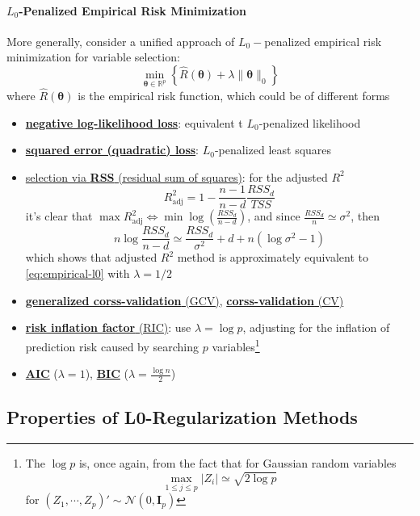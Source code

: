 \documentclass[twoside]{article}
\begin{document}
\paragraph*{$L_0$-Penalized Empirical Risk Minimization} More generally, consider a unified approach of $L_0-$penalized empirical risk minimization for variable selection:
\begin{equation}\label{eq:empirical-l0}
    \min_{\boldsymbol{\theta}\in\mathbb{R}^p}\left\{\hat{R}(\boldsymbol{\theta}) + \lambda\lVert \boldsymbol{\theta} \rVert _0 \right\}
\end{equation}
where $\hat{R}(\boldsymbol{\theta})$ is the empirical risk function, which could be of different forms
\begin{itemize}
    \item \underline{\textbf{negative log-likelihood loss}}: equivalent t $L_0$-penalized likelihood 
    \item \textbf{\underline{squared error (quadratic) loss}}: $L_0$-penalized least squares
    \item \underline{selection via \textbf{RSS} (residual sum of squares)}: for the adjusted $R^2$
    $$
    R^2_{\text{adj}} = 1-\frac{n-1}{n-d}\frac{RSS_d}{TSS}
    $$
    it's clear that $\max R^2_{\text{adj}}\Leftrightarrow \min\log\left(\frac{RSS_d}{n-d}\right)$, and since $\frac{RSS_d}{n}\simeq \sigma^2$, then $$ n\log \frac{RSS_d}{n-d}\simeq \frac{RSS_d}{\sigma^2} + d + n(\log \sigma^2 -1) $$ which shows that adjusted $R^2$ method is approximately equivalent to \ref{eq:empirical-l0} with $\lambda =1/2$
    \item \underline{\textbf{generalized corss-validation} (GCV)}, \underline{\textbf{corss-validation} (CV)}
    \item \underline{\textbf{risk inflation factor} (RIC)}: use $\lambda = \log p$, adjusting for the inflation of prediction risk caused by searching $p$ variables\footnote{The $\log p$ is, once again, from the fact that for Gaussian random variables $$ \max_{1\leq j\leq p}\lvert Z_i\rvert \simeq \sqrt{2\log p} $$ for $(Z_1,\cdots,Z_p)'\sim\mathcal{N}(0,\mathbf{I}_p)$}
    \item \underline{\textbf{AIC}} ($\lambda=1$), \underline{\textbf{BIC}} ($\lambda=\frac{\log n}{2}$)
\end{itemize}

\subsection{Properties of L0-Regularization Methods}
\end{document}
